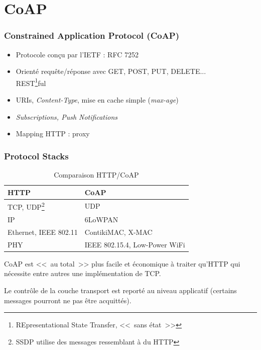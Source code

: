 \documentclass[compress]{beamer}
\begin{document}
\section{CoAP}
\begin{frame}
	\frametitle{Constrained Application Protocol (CoAP)}
	\begin{itemize}
		\item Protocole conçu par l'IETF : RFC 7252 \cite{rfc7252} \pause
	\item Orienté requête/réponse avec GET, POST, PUT, DELETE... \\
		REST\footnote{REpresentational State Transfer, <<~sans état~>>}ful \pause
	\item URIs\pause, \emph{Content-Type}\pause,
		mise en cache simple (\emph{max-age}) \pause
	\item \emph{Subscriptions, Push Notifications} \pause
	\item Mapping HTTP : proxy
	\end{itemize}
\end{frame}
\begin{frame}
	\frametitle{Protocol Stacks}
	\begin{table}[h]
	\center
	\begin{tabular}{l|l}
		HTTP & CoAP \\ \hline \pause
		TCP,
			UDP\footnote{SSDP utilise des messages ressemblant à du HTTP}
			& UDP \\ \hline \pause
		IP & 6LoWPAN \\ \hline \pause
		Ethernet, IEEE 802.11 & ContikiMAC, X-MAC \\ \hline \pause
		PHY & IEEE 802.15.4, Low-Power WiFi
	\end{tabular}
	\caption{Comparaison HTTP/CoAP}
	\end{table}
	\pause
	CoAP est <<~au total~>> plus facile et économique à traiter qu'HTTP
	qui nécessite entre autres une implémentation de TCP.

	Le contrôle de la couche transport est reporté au niveau
	applicatif (certains messages pourront ne pas être acquittés).
\end{frame}
\end{document}

